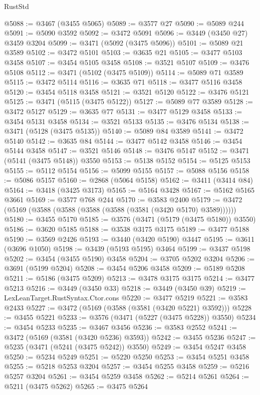 \begin{lexlean}{RustStd}
\begin{coremodule}
{{{{{{{{{{{{{{{{{{{@5088 := @3467 (@3455 @5065)
@5089 := @3577 @27
@5090 := @5089 @244
@5091 := @5090 @3592
@5092 := @3472 @5091
@5096 := @3449 (@3450 @27) @3459 @3204
@5099 := @3471 (@5092 (@3475 @5096))
@5101 := @5089 @21 @3589
@5102 := @3472 @5101
@5103 := @3635 @21
@5105 := @3477 @5103 @3458
@5107 := @3454 @5105 @3458
@5108 := @3521 @5107
@5109 := @3476 @5108
@5112 := @3471 (@5102 (@3475 @5109))
@5114 := @5089 @71 @3589
@5115 := @3472 @5114
@5116 := @3635 @71
@5118 := @3477 @5116 @3458
@5120 := @3454 @5118 @3458
@5121 := @3521 @5120
@5122 := @3476 @5121
@5125 := @3471 (@5115 (@3475 @5122))
@5127 := @5089 @77 @3589
@5128 := @3472 @5127
@5129 := @3635 @77
@5131 := @3477 @5129 @3458
@5133 := @3454 @5131 @3458
@5134 := @3521 @5133
@5135 := @3476 @5134
@5138 := @3471 (@5128 (@3475 @5135))
@5140 := @5089 @84 @3589
@5141 := @3472 @5140
@5142 := @3635 @84
@5144 := @3477 @5142 @3458
@5146 := @3454 @5144 @3458
@5147 := @3521 @5146
@5148 := @3476 @5147
@5152 := @3471 (@5141 (@3475 @5148)) @3550
@5153 := @5138 @5152
@5154 := @5125 @5153
@5155 := @5112 @5154
@5156 := @5099 @5155
@5157 := @5088 @5156
@5158 := @5086 @5157
@5160 := @2868 (@5064 @5158)
@5162 := @3411 (@3414 @84)
@5164 := @3418 (@3425 @3173)
@5165 := @5164 @3428
@5167 := @5162 @5165 @3661
@5169 := @3577 @768 @244
@5170 := @3583 @2400
@5179 := @3472 (@5169 (@3588 (@3588 (@3588 (@3588 (@3581 (@3420 @5170) @3589))))))
@5180 := @3455 @5170
@5185 := @3576 (@3471 (@5179 (@3475 @5180)) @3550)
@5186 := @3620 @5185
@5188 := @3538 @3175 @3175
@5189 := @3477 @5188
@5190 := @3569 @2426
@5193 := @3440 (@3420 @5190) @3447
@5195 := @3611 (@3696 @1050)
@5198 := @3439 (@5193 @5195) @3464
@5199 := @3437 @5198
@5202 := @3454 (@3455 @5190) @3458
@5204 := @3705 @5202 @3204
@5206 := @3691 (@5199 @5204)
@5208 := @3454 @5206 @3458
@5209 := @5189 @5208
@5211 := @5186 (@3475 @5209)
@5213 := @3478 @3175 @3175
@5214 := @3477 @5213
@5216 := @3449 (@3450 @33)
@5218 := @3449 (@3450 @39)
@5219 := LexLeanTarget.RustSyntax.Ctor.cons
@5220 := @3477 @5219
@5221 := @3583 @2433
@5227 := @3472 (@5169 (@3588 (@3581 (@3420 @5221) @3592)))
@5228 := @3455 @5221
@5233 := @3576 (@3471 (@5227 (@3475 @5228)) @3550)
@5234 := @3454 @5233
@5235 := @3467 @3456
@5236 := @3583 @2552
@5241 := @3472 (@5169 (@3581 (@3420 @5236) @3593))
@5242 := @3455 @5236
@5247 := @5235 (@3471 (@5241 (@3475 @5242)) @3550)
@5249 := @3454 @5247 @3458
@5250 := @5234 @5249
@5251 := @5220 @5250
@5253 := @3454 @5251 @3458
@5255 := @5218 @5253 @3204
@5257 := @3454 @5255 @3458
@5259 := @5216 @5257 @3204
@5261 := @3454 @5259 @3458
@5262 := @5214 @5261
@5264 := @5211 (@3475 @5262)
@5265 := @3475 @5264
}}}}}}}}}}}}}}}}}}}
\end{coremodule}
\end{lexlean}
